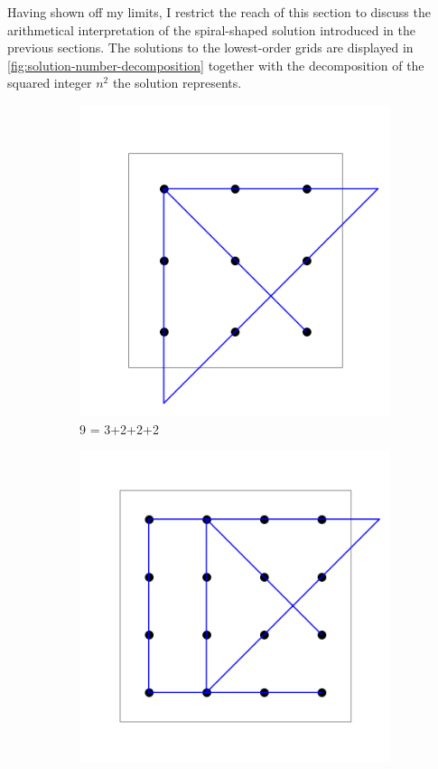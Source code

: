 \documentclass[11pt]{article}
\begin{document}
Having shown off my limits, I restrict the reach of this section to discuss the arithmetical interpretation of the spiral-shaped solution introduced in the previous sections. The solutions to the lowest-order grids are displayed in \autoref{fig:solution-number-decomposition} together with the decomposition of the squared integer $n^2$ the solution represents.
\begin{figure}
\begin{subfigure}[b]{.3\linewidth}
\includegraphics[width=\linewidth]{images/9-dots-solution.png}
\caption{9 = 3+2+2+2}\label{fig-a}
\end{subfigure}
\hfill
\begin{subfigure}[b]{.3\linewidth}
\includegraphics[width=\linewidth]{images/4x4_grid_iteration_solution.png}

\end{subfigure}
\end{figure}
\end{document}
